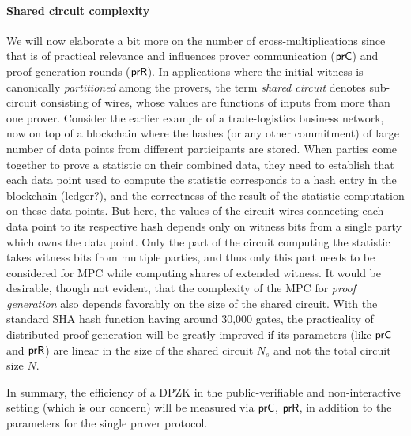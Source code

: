 \paragraph{Shared circuit complexity}
We will now elaborate a bit more on the number of cross-multiplications since
that is of practical relevance and influences prover communication ($\mathsf{prC}$)
and proof generation rounds ($\mathsf{prR}$). In applications where the initial
witness is canonically \textit{partitioned} among the provers, the term
\textit{shared circuit} denotes sub-circuit consisting of wires, whose 
values are functions of inputs from more than one prover. 
Consider the earlier example of a trade-logistics business network, now on top of 
a blockchain where the hashes (or any other commitment) of large number of data points
from different participants are stored. 
When parties come together to prove a statistic on their combined data, they
need to establish that each data point used to compute the statistic corresponds to a 
hash entry in the blockchain (ledger?), and the correctness of the result of the statistic
computation on these data points. But here, the values of the circuit wires
connecting each data point to its respective hash depends only on witness bits from a 
single party which owns the data point. Only the part of the circuit computing the 
statistic takes witness bits from multiple parties, and thus only this part
needs to be considered for MPC while computing shares of extended witness. It
would be desirable, though not evident, that the complexity of the MPC for {\em proof
generation} also depends favorably on the size of the shared circuit. 
With the standard SHA hash function having around 30,000 gates, the practicality of 
distributed proof generation will be
greatly improved if its parameters (like $\mathsf{prC}$ and $\mathsf{prR}$) are 
linear in the size of the shared circuit $N_s$ and not the total circuit size $N$.

In summary, the efficiency of a DPZK in the public-verifiable and
non-interactive setting (which is our concern) will be measured via $\mathsf{prC}$,
$\mathsf{prR}$, in addition to the parameters for the single prover protocol.

